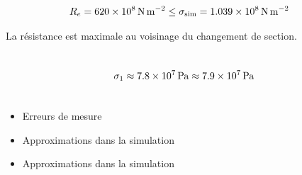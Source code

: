 \documentclass{article}
\begin{document}
\begin{equation*}
	\begin{split}
		R_e = \SI{620E8}{\newton\per\meter\squared} &\leq  \sigma_{\text{sim}} = \SI{1.039E8}{\newton\per\meter\squared}
	\end{split}
\end{equation*}

La résistance est maximale au voisinage du changement de section.

\section{}

\[ 
	\sigma_1 \approx \SI{7.8E7}{\pascal} \approx \SI{7.9E7}{\pascal}
\]

\section{}

\begin{itemize}
	\item Erreurs de mesure
	\item Approximations dans la simulation
	\item Approximations dans la simulation
\end{itemize}
\end{document}
